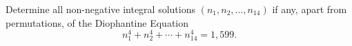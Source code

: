 Determine all non-negative integral solutions $ (n_{1},n_{2},\dots , n_{14}) $ if any, apart from permutations, of the Diophantine Equation \[n_{1}^{4}+n_{2}^{4}+\cdots+n_{14}^{4}=1,599.\]
